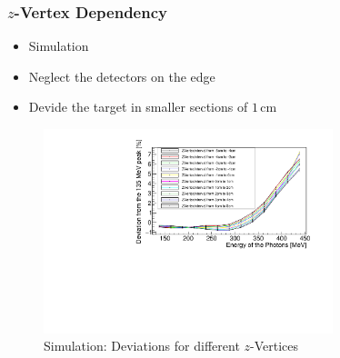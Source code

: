 \documentclass[slidestop,compress,mathserif]{beamer}
\begin{document}
\begin{frame}
	\frametitle{$z$-Vertex Dependency}
	\begin{itemize}
		\item Simulation
		\item Neglect the detectors on the edge
		\item Devide the target in smaller sections of $1\,\text{cm}$
	\end{itemize}


\begin{figure}
	\includegraphics[width=0.750\textwidth]{Pictures/20172804MCZVertexDeviation}
	\caption{Simulation: Deviations for different $z$-Vertices}
\end{figure}

\end{frame}
\end{document}
